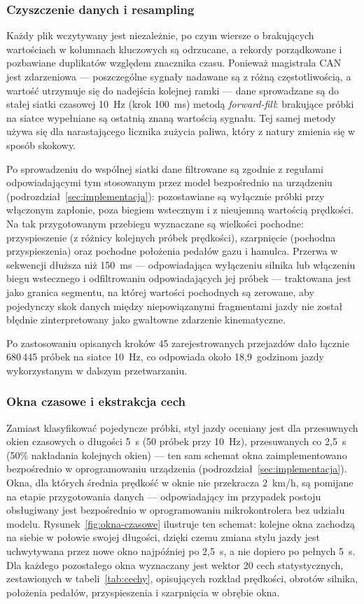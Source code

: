\subsubsection{Czyszczenie danych i resampling}

Każdy plik wczytywany jest niezależnie, po czym wiersze o brakujących
wartościach w kolumnach kluczowych są odrzucane, a rekordy porządkowane
i pozbawiane duplikatów względem znacznika czasu. Ponieważ magistrala CAN jest
zdarzeniowa --- poszczególne sygnały nadawane są z różną częstotliwością,
a wartość utrzymuje się do nadejścia kolejnej ramki --- dane sprowadzane są
do stałej siatki czasowej 10~Hz (krok 100~ms) metodą \emph{forward-fill}:
brakujące próbki na siatce wypełniane są ostatnią znaną wartością sygnału.
Tej samej metody używa się dla narastającego licznika zużycia paliwa, który
z natury zmienia się w sposób skokowy.

Po sprowadzeniu do wspólnej siatki dane filtrowane są zgodnie z regułami
odpowiadającymi tym stosowanym przez model bezpośrednio na urządzeniu
(podrozdział~\ref{sec:implementacja}): pozostawiane są wyłącznie próbki przy
włączonym zapłonie, poza biegiem wstecznym i z nieujemną wartością prędkości.
Na tak przygotowanym przebiegu wyznaczane są wielkości pochodne: przyspieszenie
(z różnicy kolejnych próbek prędkości), szarpnięcie (pochodna przyspieszenia)
oraz pochodne położenia pedałów gazu i hamulca. Przerwa w sekwencji dłuższa
niż 150~ms --- odpowiadająca wyłączeniu silnika lub włączeniu biegu
wstecznego i odfiltrowaniu odpowiadających jej próbek --- traktowana jest jako
granica segmentu, na której wartości pochodnych są zerowane, aby pojedynczy
skok danych między niepowiązanymi fragmentami jazdy nie został błędnie
zinterpretowany jako gwałtowne zdarzenie kinematyczne.

Po zastosowaniu opisanych kroków 45 zarejestrowanych przejazdów dało łącznie
680\,445 próbek na siatce 10~Hz, co odpowiada około 18,9~godzinom jazdy
wykorzystanym w dalszym przetwarzaniu.

\subsubsection{Okna czasowe i ekstrakcja cech}

Zamiast klasyfikować pojedyncze próbki, styl jazdy oceniany jest dla
przesuwnych okien czasowych o długości 5~s (50 próbek przy 10~Hz), przesuwanych
co 2,5~s (50\% nakładania kolejnych okien) --- ten sam schemat okna
zaimplementowano bezpośrednio w oprogramowaniu urządzenia
(podrozdział~\ref{sec:implementacja}). Okna, dla których średnia prędkość
w oknie nie przekracza 2~km/h, są pomijane na etapie przygotowania danych ---
odpowiadający im przypadek postoju obsługiwany jest bezpośrednio w
oprogramowaniu mikrokontrolera bez udziału modelu. Rysunek~\ref{fig:okna-czasowe}
ilustruje ten schemat: kolejne okna zachodzą na siebie w połowie swojej
długości, dzięki czemu zmiana stylu jazdy jest uchwytywana przez nowe okno
najpóźniej po 2,5~s, a nie dopiero po pełnych 5~s. Dla każdego pozostałego
okna wyznaczany jest wektor 20 cech statystycznych, zestawionych w
tabeli~\ref{tab:cechy}, opisujących rozkład prędkości, obrotów silnika,
położenia pedałów, przyspieszenia i szarpnięcia w obrębie okna.

